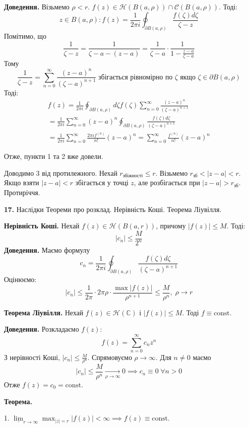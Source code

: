 \documentclass[14pt]{extarticle}
\begin{document}
\textbf{Доведення.} Візьмемо $\rho<r$. $f(z) \in \mathcal{H}(B(a,\rho)) \cap \mathcal{C}(B(a,\rho))$. Тоді:
\[
z \in B(a,\rho): f(z) = \frac{1}{2\pi i}\oint_{\partial B(a,\rho)} \frac{f(\zeta)d\zeta}{\zeta-z}
\]
Помітимо, що
\[
\frac{1}{\zeta-z}=\frac{1}{\zeta-a-(z-a)} = \frac{1}{\zeta-a} \cdot \frac{1}{1-\frac{z-a}{\zeta-a}}
\]
Тому
\[
\frac{1}{\zeta-z} = \sum_{n=0}^{\infty} \frac{(z-a)^n}{(\zeta-a)^{n+1}} \; \text{збігається рівномірно по $\zeta$ якщо $\zeta \in \partial B(a,\rho)$}
\]
Тоді:
\begin{gather*}
f(z) = \frac{1}{2\pi i}\oint_{\partial B(a,\rho)} d\zeta f(\zeta) \sum_{n=0}^{\infty} \frac{(z-a)^n}{(\zeta-a)^{n+1}} \\
= \frac{1}{2\pi i}\sum_{n=0}^{\infty} (z-a)^n \oint_{\partial B(a,\rho)} \frac{f(\zeta)d\zeta}{(\zeta-a)^{n+1}} \\
= \frac{1}{2\pi i}\sum_{n=0}^{\infty} \frac{2\pi i f^{(n)}}{n!}(z-a)^n = \sum_{n=0}^{\infty} \frac{f^{(n)}}{n!}(z-a)^n
\end{gather*}

Отже, пункти 1 та 2 вже довели. 

Доводимо 3 від протилежного. Нехай $r_{\text{збіжності}} \leq r$. Візьмемо $r_{\text{зб}} < |z-a| < r$. Якщо взяти $|z-a|<r$ збігається у точці $z$, але розбігається при $|z-a|>r_{\text{зб}}$. Протиріччя. 

\textbf{17.} Наслідки Теореми про розклад. Нерівність Коші. Теорема Ліувілля.

\textbf{Нерівність Коші.} Нехай $f(z) \in \mathcal{H}(B(a,r))$, причому $|f(z)| \leq M$. Тоді:
\[
|c_n| \leq \frac{M}{2^n}
\]
\textbf{Доведення.} Маємо формулу
\[
c_n = \frac{1}{2\pi i}\oint_{\partial B(a,\rho)} \frac{f(\zeta)d\zeta}{(\zeta-a)^{n+1}}
\]
Оцінюємо:
\[
|c_n| \leq \frac{1}{2\pi} \cdot 2\pi \rho \cdot \frac{\max|f(z)|}{\rho^{n+1}} \leq \frac{M}{\rho^n}, \; \rho \to r
\]

\textbf{Теорема Ліувілля.} Нехай $f(z) \in \mathcal{H}(\mathbb{C})$ і $|f(z)| \leq M$. Тоді $f \equiv \text{const}$.

\textbf{Доведення.} Розкладаємо $f(z)$:
\[
f(z) = \sum_{n=0}^{\infty} c_nz^n
\]
З нерівності Коші, $|c_n| \leq \frac{M}{\rho^{n}}$. Спрямовуємо $\rho \to \infty$. Для $n \neq 0$ маємо
\[
|c_n| \leq \frac{M}{\rho^n} \xrightarrow[\rho \to \infty]{} 0 \implies c_n \equiv 0 \; \forall n > 0
\]
Отже $f(z) = c_0 = \text{const}$. 

\textbf{Теорема.} 

1. $\underline{\lim}_{r \to \infty} \max_{|z|=r}|f(z)| < \infty \implies f(z) \equiv \text{const}$.  
\end{document}
